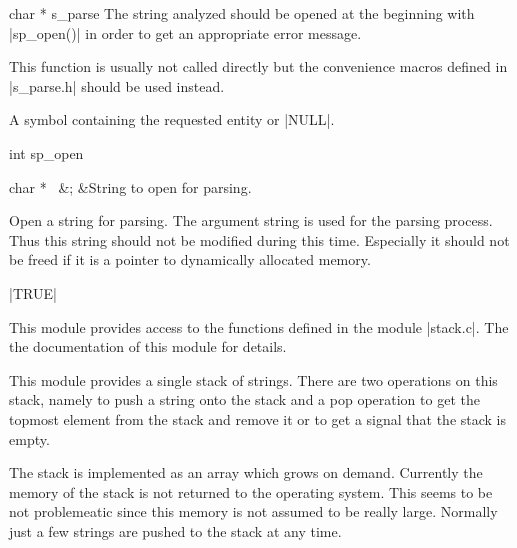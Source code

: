 \begin{Function}{char * }{s\_parse}
  The string analyzed should be opened at the beginning
  with |sp_open()| in order to get an appropriate error
  message. 
  
  This function is usually not called directly but the
  convenience macros defined in |s_parse.h| should be
  used instead.
  \begin{Result}
    A symbol containing the requested entity or |NULL|.
  \end{Result}
\end{Function}
\begin{Function}{int }{sp\_open}
  \begin{Arguments}
    char * \ 	&;	&String to open for parsing.
  \end{Arguments}%
  Open a string for parsing. The argument string is used
  for the parsing process.  Thus this string should not
  be modified during this time.  Especially it should
  not be freed if it is a pointer to dynamically
  allocated memory.
  \begin{Result}
    |TRUE|
  \end{Result}
\end{Function}


This module provides access to the functions defined in the
module |stack.c|. The the documentation of this module for
details.



This module provides a single stack of strings. There are two
operations on this stack, namely to push a string onto the
stack and a pop operation to get the topmost element from the
stack and remove it or to get a signal that the stack is
empty. 

The stack is implemented as an array which grows on demand.
Currently the memory of the stack is not returned to the
operating system. This seems to be not problemeatic since this
memory is not assumed to be really large. Normally just a few
strings are pushed to the stack at any time.

